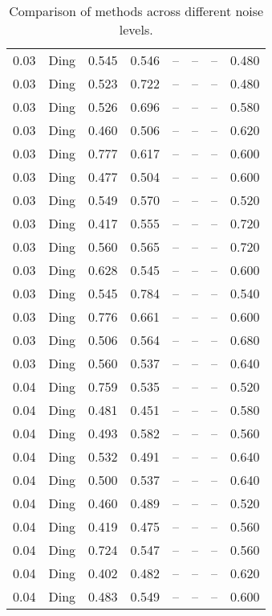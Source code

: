 \begin{table}[H]
\begin{tabular}{l c l l l}
0.03 & Ding & 0.545 & 0.546 & -- & -- & -- & 0.480 \\
0.03 & Ding & 0.523 & 0.722 & -- & -- & -- & 0.480 \\
0.03 & Ding & 0.526 & 0.696 & -- & -- & -- & 0.580 \\
0.03 & Ding & 0.460 & 0.506 & -- & -- & -- & 0.620 \\
0.03 & Ding & 0.777 & 0.617 & -- & -- & -- & 0.600 \\
0.03 & Ding & 0.477 & 0.504 & -- & -- & -- & 0.600 \\
0.03 & Ding & 0.549 & 0.570 & -- & -- & -- & 0.520 \\
0.03 & Ding & 0.417 & 0.555 & -- & -- & -- & 0.720 \\
0.03 & Ding & 0.560 & 0.565 & -- & -- & -- & 0.720 \\
0.03 & Ding & 0.628 & 0.545 & -- & -- & -- & 0.600 \\
0.03 & Ding & 0.545 & 0.784 & -- & -- & -- & 0.540 \\
0.03 & Ding & 0.776 & 0.661 & -- & -- & -- & 0.600 \\
0.03 & Ding & 0.506 & 0.564 & -- & -- & -- & 0.680 \\
0.03 & Ding & 0.560 & 0.537 & -- & -- & -- & 0.640 \\
0.04 & Ding & 0.759 & 0.535 & -- & -- & -- & 0.520 \\
0.04 & Ding & 0.481 & 0.451 & -- & -- & -- & 0.580 \\
0.04 & Ding & 0.493 & 0.582 & -- & -- & -- & 0.560 \\
0.04 & Ding & 0.532 & 0.491 & -- & -- & -- & 0.640 \\
0.04 & Ding & 0.500 & 0.537 & -- & -- & -- & 0.640 \\
0.04 & Ding & 0.460 & 0.489 & -- & -- & -- & 0.520 \\
0.04 & Ding & 0.419 & 0.475 & -- & -- & -- & 0.560 \\
0.04 & Ding & 0.724 & 0.547 & -- & -- & -- & 0.560 \\
0.04 & Ding & 0.402 & 0.482 & -- & -- & -- & 0.620 \\
0.04 & Ding & 0.483 & 0.549 & -- & -- & -- & 0.600 \\
\midrule
\bottomrule
\end{tabular}
\label{tab:SyntheticNoise}
\caption{Comparison of methods across different noise levels.}
\end{table}
